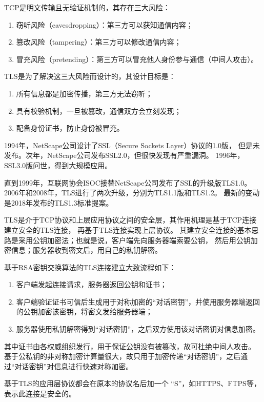 \begin{itemize}
    TCP是明文传输且无验证机制的，其存在三大风险：

    \begin{enumerate}
        \item 窃听风险（eavesdropping）：第三方可以获知通信内容；
        \item 篡改风险（tampering）：第三方可以修改通信内容；
        \item 冒充风险（pretending）：第三方可以冒充他人身份参与通信（中间人攻击）。
    \end{enumerate}

    TLS是为了解决这三大风险而设计的，其设计目标是：

    \begin{enumerate}
        \item 所有信息都是加密传播，第三方无法窃听；
        \item 具有校验机制，一旦被篡改，通信双方会立刻发现；
        \item 配备身份证书，防止身份被冒充。
    \end{enumerate}

    1994年，NetScape公司设计了SSL（Secure Sockets Layer）协议的1.0版，
    但是未发布。次年，NetScape公司发布SSL2.0，但很快发现有严重漏洞。
    1996年，SSL3.0版问世，得到大规模应用。

    直到1999年，互联网协会ISOC接替NetScape公司发布了SSL的升级版TLS1.0。
    2006年和2008年，TLS进行了两次升级，分别为TLS1.1版和TLS1.2。
    最新的变动是2018年发布的TLS1.3标准提案。

    TLS是介于TCP协议和上层应用协议之间的安全层，其作用机理是基于TCP连接建立安全的TLS连接，
    再基于TLS连接实现上层协议。
    其建立安全连接的基本思路是采用公钥加密法；也就是说，客户端先向服务器端索要公钥，
    然后用公钥加密信息；服务器收到密文后，用自己的私钥解密。

    基于RSA密钥交换算法\cite{rfc8017}的TLS连接建立大致流程如下：

    \begin{enumerate}
        \item 客户端发起连接请求，服务器返回公钥和证书；
        \item 客户端验证证书可信后生成用于对称加密的“对话密钥”，并使用服务器端返回的公钥加密该密钥，将密文发给服务器端；
        \item 服务器使用私钥解密得到“对话密钥”，之后双方使用该对话密钥对信息加密。
    \end{enumerate}

    其中证书由各权威组织发行，用于保证公钥没有被篡改，故可杜绝中间人攻击。
    基于公私钥的非对称加密计算量很大，故只用于加密传递“对话密钥”，之后通过“对话密钥”对信息进行快速对称加密。

    基于TLS的应用层协议都会在原本的协议名后加一个 “S”，如HTTPS、FTPS等，表示此连接是安全的。

\end{itemize}

